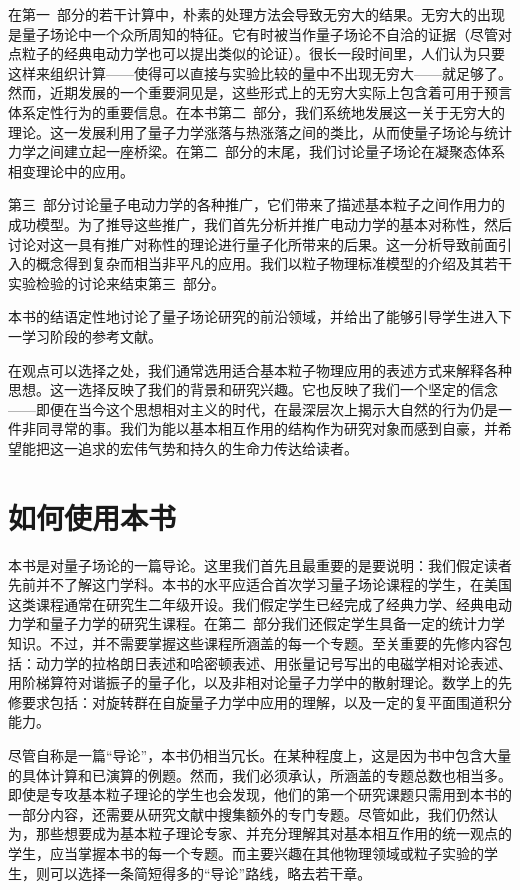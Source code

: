 在第一~部分的若干计算中，朴素的处理方法会导致无穷大的结果。无穷大的出现是量子场论中一个众所周知的特征。它有时被当作量子场论不自洽的证据（尽管对点粒子的经典电动力学也可以提出类似的论证）。很长一段时间里，人们认为只要这样来组织计算——使得可以直接与实验比较的量中不出现无穷大——就足够了。然而，近期发展的一个重要洞见是，这些形式上的无穷大实际上包含着可用于预言体系定性行为的重要信息。在本书第二~部分，我们系统地发展这一关于无穷大的理论。这一发展利用了量子力学涨落与热涨落之间的类比，从而使量子场论与统计力学之间建立起一座桥梁。在第二~部分的末尾，我们讨论量子场论在凝聚态体系相变理论中的应用。

第三~部分讨论量子电动力学的各种推广，它们带来了描述基本粒子之间作用力的成功模型。为了推导这些推广，我们首先分析并推广电动力学的基本对称性，然后讨论对这一具有推广对称性的理论进行量子化所带来的后果。这一分析导致前面引入的概念得到复杂而相当非平凡的应用。我们以粒子物理标准模型的介绍及其若干实验检验的讨论来结束第三~部分。

本书的结语定性地讨论了量子场论研究的前沿领域，并给出了能够引导学生进入下一学习阶段的参考文献。

在观点可以选择之处，我们通常选用适合基本粒子物理应用的表述方式来解释各种思想。这一选择反映了我们的背景和研究兴趣。它也反映了我们一个坚定的信念——即便在当今这个思想相对主义的时代，在最深层次上揭示大自然的行为仍是一件非同寻常的事。我们为能以基本相互作用的结构作为研究对象而感到自豪，并希望能把这一追求的宏伟气势和持久的生命力传达给读者。

\section*{如何使用本书}

本书是对量子场论的一篇导论。这里我们首先且最重要的是要说明：我们假定读者先前并不了解这门学科。本书的水平应适合首次学习量子场论课程的学生，在美国这类课程通常在研究生二年级开设。我们假定学生已经完成了经典力学、经典电动力学和量子力学的研究生课程。在第二~部分我们还假定学生具备一定的统计力学知识。不过，并不需要掌握这些课程所涵盖的每一个专题。至关重要的先修内容包括：动力学的拉格朗日表述和哈密顿表述、用张量记号写出的电磁学相对论表述、用阶梯算符对谐振子的量子化，以及非相对论量子力学中的散射理论。数学上的先修要求包括：对旋转群在自旋量子力学中应用的理解，以及一定的复平面围道积分能力。

尽管自称是一篇``导论''，本书仍相当冗长。在某种程度上，这是因为书中包含大量的具体计算和已演算的例题。然而，我们必须承认，所涵盖的专题总数也相当多。即使是专攻基本粒子理论的学生也会发现，他们的第一个研究课题只需用到本书的一部分内容，还需要从研究文献中搜集额外的专门专题。尽管如此，我们仍然认为，那些想要成为基本粒子理论专家、并充分理解其对基本相互作用的统一观点的学生，应当掌握本书的每一个专题。而主要兴趣在其他物理领域或粒子实验的学生，则可以选择一条简短得多的``导论''路线，略去若干章。

